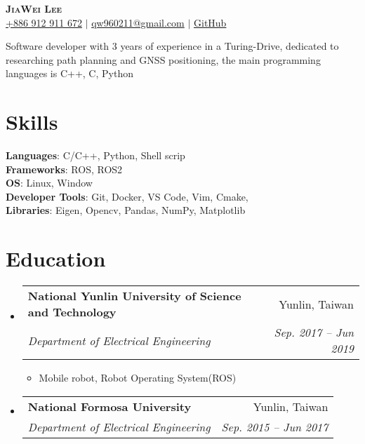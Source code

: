 \documentclass[letterpaper,11pt]{article}
\makeatletter
\newcommand{\resumeItem}[1]{
  \item\small{
    {#1 \vspace{-2pt}}
  }
}
\newcommand{\resumeSubheading}[4]{
  \vspace{-2pt}\item
    \begin{tabular*}{0.97\textwidth}[t]{l@{\extracolsep{\fill}}r}
      \textbf{#1} & #2 \\
      \textit{\small#3} & \textit{\small #4} \\
    \end{tabular*}\vspace{-7pt}
}
\newcommand{\resumeSubHeadingListStart}{\begin{itemize}[leftmargin=0.15in, label={}]}
\newcommand{\resumeSubHeadingListEnd}{\end{itemize}}
\newcommand{\resumeItemListStart}{\begin{itemize}}
\newcommand{\resumeItemListEnd}{\end{itemize}\vspace{-5pt}}
\makeatother
\begin{document}
\begin{center}
    \textbf{\Huge \scshape JiaWei Lee} \\ \vspace{3pt}
    \faMobile \hspace{.5pt} \href{tel:0912911672}{\color{blue}+886 912 911 672} $|$
    \faAt \hspace{.5pt} \href{mailto:qw960211@gmail.com}{\color{blue}qw960211@gmail.com} $|$
    \faGithub \hspace{.5pt} \href{https://github.com/EC404}{\color{blue}GitHub}
\end{center}

{Software developer with 3 years of experience in a Turing-Drive, dedicated to researching
path planning and GNSS positioning, the main programming languages is C++, C, Python} \\

\section{\textbf{Skills}}
 \begin{itemize}[leftmargin=0.15in, label={}]
    \small{\item{
     \textbf{Languages}{: C/C++, Python, Shell scrip} \\
     \textbf{Frameworks}{: ROS, ROS2} \\
     \textbf{OS}{: Linux, Window} \\
     \textbf{Developer Tools}{: Git, Docker, VS Code, Vim, Cmake, } \\
     \textbf{Libraries}{: Eigen, Opencv, Pandas, NumPy, Matplotlib}
    }}
 \end{itemize}

\section{\textbf{Education}}
  \vspace{3pt}
  \resumeSubHeadingListStart
    \resumeSubheading
      {National Yunlin University of Science and Technology}{Yunlin, Taiwan}
      {Department of Electrical Engineering}{Sep. 2017 -- Jun 2019}
      \resumeItemListStart
        \resumeItem{Mobile robot, Robot Operating System(ROS)}
      \resumeItemListEnd
    \resumeSubheading
      {National Formosa University}{Yunlin, Taiwan}
      {Department of Electrical Engineering}{Sep. 2015 -- Jun 2017}
  \resumeSubHeadingListEnd
\end{document}
